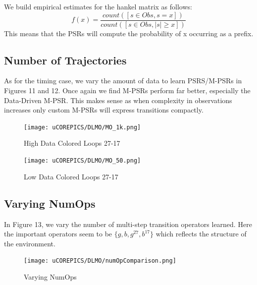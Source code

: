 We build empirical estimates for the hankel matrix as follows:
\begin{equation*}
 f(x)=\dfrac{count([s \in Obs, s=x])}{count([s \in Obs, |s| \geq x])}
\end{equation*}  
This means that the PSRs will compute the probability of x occurring as a prefix.

\subsection{Number of Trajectories}

As for the timing case, we vary the amount of data to learn PSRS/M-PSRs in Figures 11 and 12. Once again we find M-PSRs perform far better, especially the Data-Driven M-PSR. This makes sense as when complexity in observations increases only custom M-PSRs will express transitions compactly.

\begin{figure}[ht!]
\centering
\texttt{[image: uCOREPICS/DLMO/MO\_1k.png]}
\caption{High Data Colored Loops 27-17\label{overflow}}
\end{figure}

\begin{figure}[ht!]
\centering
\texttt{[image: uCOREPICS/DLMO/MO\_50.png]}
\caption{Low Data Colored Loops 27-17\label{overflow}}
\end{figure}

\subsection{Varying NumOps}

In Figure 13, we vary the number of multi-step transition operators learned. Here the important operators seem to be $\{g,b,g^{27},b^{17}\}$ which reflects the structure of the environment.

\begin{figure}[ht!]
\centering
\texttt{[image: uCOREPICS/DLMO/numOpComparison.png]}
\caption{Varying NumOps\label{overflow}}
\end{figure}
